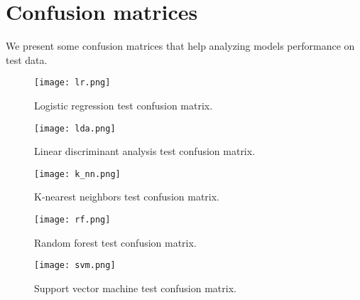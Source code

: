 \section{Confusion matrices}
        \label{sec:confusion_matrices}

        We present some confusion matrices that help analyzing models performance on test data.

        \begin{figure}[H]
                \centering
                \texttt{[image: lr.png]}
                \caption{Logistic regression test confusion matrix.}
                \label{fig:lr}
        \end{figure}

        \begin{figure}[H]
                \centering
                \texttt{[image: lda.png]}
                \caption{Linear discriminant analysis test confusion matrix.}
                \label{fig:lda}
        \end{figure}

        \begin{figure}[H]
                \centering
                \texttt{[image: k\_nn.png]}
                \caption{K-nearest neighbors test confusion matrix.}
                \label{fig:k_nn}
        \end{figure}

        \begin{figure}[H]
                \centering
                \texttt{[image: rf.png]}
                \caption{Random forest test confusion matrix.}
                \label{fig:rf}
        \end{figure}

        \begin{figure}[H]
                \centering
                \texttt{[image: svm.png]}
                \caption{Support vector machine test confusion matrix.}
                \label{fig:svm}
        \end{figure}

